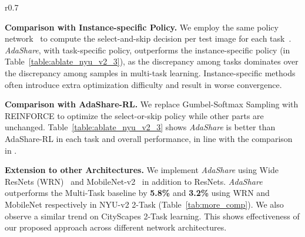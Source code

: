 \begin{wraptable}{r}{0.7\linewidth}{
\caption{\small{\textbf{Different Network Architectures on NYU v2 2-Task Learning.} : Semantic Segmentation, : Surface Normal Prediction.}}
\label{tab:more_comp}
}
\end{wraptable}
 
\textbf{Comparison with Instance-specific Policy.} We employ the same policy network~\cite{ahn2019deep} to compute the select-and-skip decision per test image for each task~\cite{veit2018convolutional,wu2018blockdrop}. \textit{AdaShare}, with task-specific policy, outperforms the instance-specific policy (in Table~\ref{table:ablate_nyu_v2_3}), as the discrepancy among tasks dominates over the discrepancy among samples in multi-task learning. Instance-specific methods often introduce extra optimization difficulty and result in worse convergence. 

\textbf{Comparison with AdaShare-RL.} We replace Gumbel-Softmax Sampling with REINFORCE to optimize the select-or-skip policy while other parts are unchanged. Table~\ref{table:ablate_nyu_v2_3} shows \textit{AdaShare} is better than AdaShare-RL in each task and overall performance, in line with the comparison in \cite{wu2019liteeval}.

\textbf{Extension to other Architectures.}  We implement \textit{AdaShare} using Wide ResNets (WRN)~\cite{zagoruyko2016wide} and MobileNet-v2~\cite{sandler2018mobilenetv2} in addition to ResNets. \textit{AdaShare} outperforms the Multi-Task baseline by \textbf{5.8\%} and \textbf{3.2\%} using WRN and MobileNet respectively in NYU-v2 2-Task (Table~\ref{tab:more_comp}). We also observe a similar trend on CityScapes 2-Task learning. This shows effectiveness of our proposed approach across different network architectures.  

